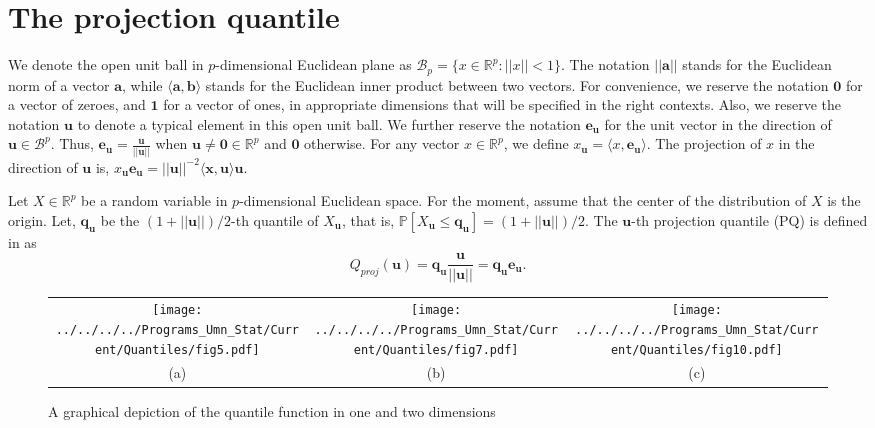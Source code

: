 \documentclass[twoside]{article}
\newcommand{\mbfeu}{\mathbf{e}_{\mathbf u} }
\begin{document}
 
\section{The projection quantile} 
\label{sec:PQ}

We denote the  open unit ball in $p$-dimensional Euclidean plane as 
$\mathcal{B}_{p} = \{ x  \in \mathbb{R}^{p}: || x || < 1 \}$. The notation 
$|| \mathbf{a} ||$ stands for the Euclidean norm of a vector $\mathbf{a}$, while 
$\langle \mathbf{a}, \mathbf{b} \rangle$ 
stands for the Euclidean inner product between two vectors.
For convenience, we reserve the notation 
$\mathbf{0}$ for a vector of zeroes, and $\mathbf{1}$ for a vector of ones, in appropriate 
dimensions that will be specified in the right contexts. 
Also, we reserve the notation $\mathbf{u}$ to 
denote a typical element in this open unit ball. 
We further reserve the notation $\mathbf{e}_{\mathbf u}$ 
for the unit vector in the direction of 
$\mathbf{u} \in \mathcal{B}^p$. Thus,  $\mathbf{e}_{\mathbf u}  = 
\frac{\mathbf{u}}{||\mathbf{u}||}$ when 
$\mathbf{u} \ne \mathbf{0} \in \mathbb{R}^{p}$ and 
$\mathbf{0}$ otherwise.
For any vector ${x} \in \mathbb{R}^{p}$, we define 
${x}_\mathbf{u} = \langle {x}, \mbfeu \rangle$.
The projection of ${x}$ in the direction of $\mathbf{u}$ is,
${x}_\mathbf{u} \mbfeu 
= ||\mathbf{u}||^{-2} \langle \mathbf{x}, \mathbf{u} \rangle \mathbf{u}$. 


Let ${X} \in \mathbb{R}^p$ be a random variable in $p$-dimensional Euclidean 
space. 
For the moment, assume that the center of the distribution of ${X}$ 
is the origin. 
Let, $\mathbf{q}_\mathbf{u}$ be the $ (1 + || \mathbf{u} ||)/2$-th quantile of 
${X}_\mathbf{u}$, that is, 
$\mathbb{P} [ {X}_\mathbf{u} \leq \mathbf{q}_\mathbf{u} ] = 
(1 + || \mathbf{u} || )/2$. The $\mathbf{u}$-th projection quantile (PQ) is defined 
in \cite{MukhopadhyayC11} as
\begin{equation}
Q_{proj} (\mathbf{u}) = \mathbf{q}_\mathbf{u} \frac{\mathbf{u}}{||\mathbf{u}||} 
= \mathbf{q}_\mathbf{u} \mbfeu.
\end{equation}

\begin{figure*}[htb]
\centering 
\begin{tabular}{|c|c|c|}
\hline 
\texttt{[image: ../../../../Programs\_Umn\_Stat/Current/Quantiles/fig5.pdf]} &
\texttt{[image: ../../../../Programs\_Umn\_Stat/Current/Quantiles/fig7.pdf]} &
\texttt{[image: ../../../../Programs\_Umn\_Stat/Current/Quantiles/fig10.pdf]} \\
(a) & (b) & (c) \\
\hline 
\end{tabular}
\caption{A graphical depiction of the quantile function in one and two dimensions}
\label{fig:2}
\end{figure*}
\end{document}
